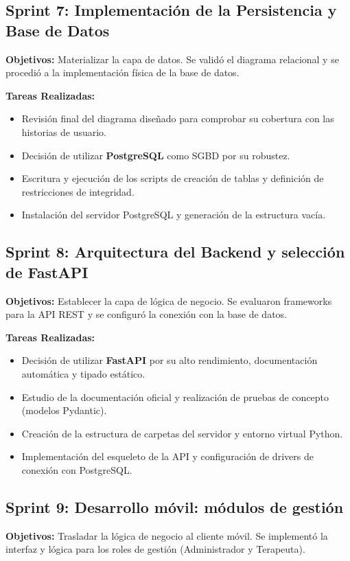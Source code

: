 \subsection{Sprint 7: Implementación de la Persistencia y Base de Datos}
\textbf{Objetivos:} Materializar la capa de datos. Se validó el diagrama relacional y se procedió a la implementación física de la base de datos.

\textbf{Tareas Realizadas:}
\begin{itemize}
    \item Revisión final del diagrama diseñado para comprobar su cobertura con las historias de usuario.
    \item Decisión de utilizar \textbf{PostgreSQL} como SGBD por su robustez.
    \item Escritura y ejecución de los scripts de creación de tablas y definición de restricciones de integridad.
    \item Instalación del servidor PostgreSQL y generación de la estructura vacía.
\end{itemize}

\subsection{Sprint 8: Arquitectura del Backend y selección de FastAPI}
\textbf{Objetivos:} Establecer la capa de lógica de negocio. Se evaluaron frameworks para la API REST y se configuró la conexión con la base de datos.

\textbf{Tareas Realizadas:}
\begin{itemize}
    \item Decisión de utilizar \textbf{FastAPI} por su alto rendimiento, documentación automática y tipado estático.
    \item Estudio de la documentación oficial y realización de pruebas de concepto (modelos Pydantic).
    \item Creación de la estructura de carpetas del servidor y entorno virtual Python.
    \item Implementación del esqueleto de la API y configuración de drivers de conexión con PostgreSQL.
\end{itemize}

\subsection{Sprint 9: Desarrollo móvil: módulos de gestión}
\textbf{Objetivos:} Trasladar la lógica de negocio al cliente móvil. Se implementó la interfaz y lógica para los roles de gestión (Administrador y Terapeuta).

